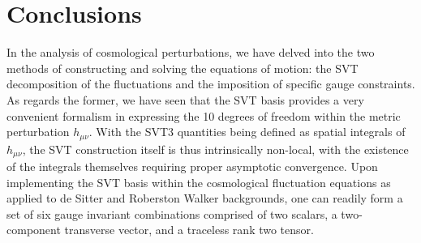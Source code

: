 \chapter{Conclusions}
\label{C7}

In the analysis of cosmological perturbations, we have delved into the two methods of constructing and solving the equations of motion: the SVT decomposition of the fluctuations and the imposition of specific gauge constraints. As regards the former, we have seen that the SVT basis provides a very convenient formalism in expressing the 10 degrees of freedom within the metric perturbation $h_{\mu\nu}$. With the SVT3 quantities being defined as spatial integrals of $h_{\mu\nu}$, the SVT construction itself is thus intrinsically non-local, with the existence of the integrals themselves requiring proper asymptotic convergence. Upon implementing the SVT basis within the cosmological fluctuation equations as applied to de Sitter and Roberston Walker backgrounds, one can readily form a set of six gauge invariant combinations comprised of two scalars, a two-component transverse vector, and a traceless rank two tensor. 

